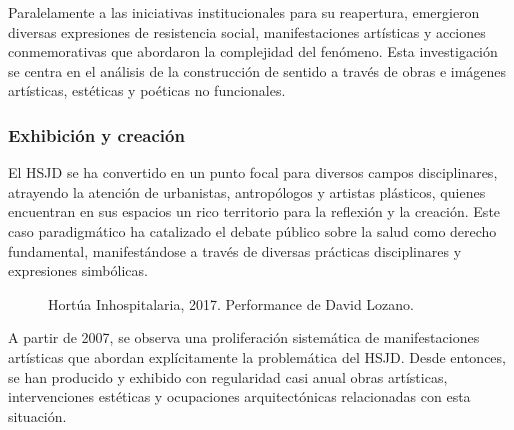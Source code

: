 Paralelamente a las iniciativas institucionales para su reapertura, emergieron diversas expresiones de resistencia social, manifestaciones artísticas y acciones conmemorativas que abordaron la complejidad del fenómeno. Esta investigación se centra en el análisis de la construcción de sentido a través de obras e imágenes artísticas, estéticas y poéticas no funcionales.

\subsubsection*{Exhibición y creación}

El HSJD se ha convertido en un punto focal para diversos campos disciplinares, atrayendo la atención de urbanistas, antropólogos y artistas plásticos, quienes encuentran en sus espacios un rico territorio para la reflexión y la creación. Este caso paradigmático ha catalizado el debate público sobre la salud como derecho fundamental, manifestándose a través de diversas prácticas disciplinares y expresiones simbólicas.

\begin{figure}[p]
    \thispagestyle{empty}
    \captionsetup{labelformat=empty,textformat=empty}
    \caption{Hortúa Inhospitalaria, 2017. Performance de David Lozano.}
    \label{fig:david_lozano_hortua}
\end{figure}

A partir de 2007, se observa una proliferación sistemática de manifestaciones artísticas que abordan explícitamente la problemática del HSJD. Desde entonces, se han producido y exhibido con regularidad casi anual obras artísticas, intervenciones estéticas y ocupaciones arquitectónicas relacionadas con esta situación.

